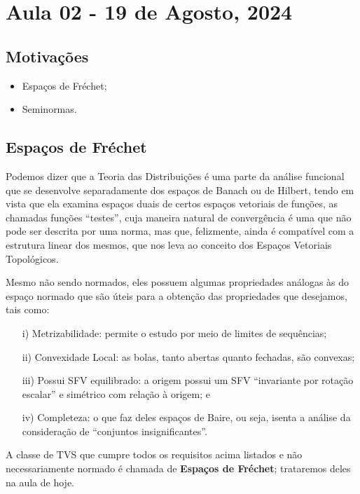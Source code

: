 \documentclass[../distribution_theory_notes.tex]{subfiles}
\begin{document}
\section{Aula 02 - 19 de Agosto, 2024}
\subsection{Motivações}
\begin{itemize}
	\item Espaços de Fréchet;
	\item Seminormas.
\end{itemize}
\subsection{Espaços de Fréchet}
Podemos dizer que a Teoria das Distribuições é uma parte da análise funcional que se desenvolve separadamente dos espaços de Banach ou de Hilbert, tendo em vista que ela examina espaços duais de certos espaços vetoriais de funções, as chamadas funções ``testes'', cuja maneira natural de convergência é uma que não pode ser descrita por uma norma, mas que, felizmente, ainda é compatível com a estrutura linear dos mesmos, que nos leva ao conceito dos Espaços Vetoriais Topológicos.

Mesmo não sendo normados, eles possuem algumas propriedades análogas às do espaço normado que são úteis para a obtenção das propriedades que desejamos, tais como:
\begin{itemize}
	\item[i)] Metrizabilidade: permite o estudo por meio de limites de sequências;
	\item[ii)] Convexidade Local: as bolas, tanto abertas quanto fechadas, são convexas;
	\item[iii)] Possui SFV equilibrado: a origem possui um SFV ``invariante por rotação escalar'' e simétrico com relação à origem; e
	\item[iv)] Completeza: o que faz deles espaços de Baire, ou seja, isenta a análise da consideração de ``conjuntos insignificantes''.
\end{itemize}
A classe de TVS que cumpre todos os requisitos acima listados e não necessariamente normado é chamada de \textbf{Espaços de Fréchet}; trataremos deles na aula de hoje.
\end{document}
